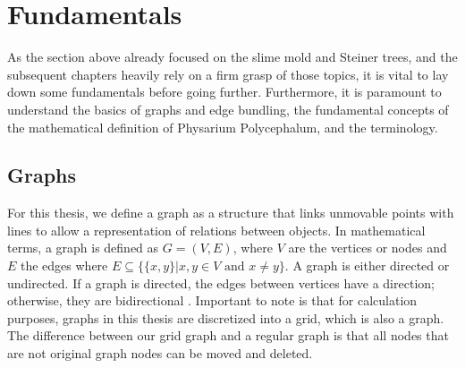 
\chapter{Fundamentals}
\label{sec:fundamentals}
As the section above already focused on the slime mold and Steiner trees, and the subsequent chapters heavily rely on a firm grasp of those topics, it is vital to lay down some fundamentals before going further. Furthermore, it is paramount to understand the basics of graphs and edge bundling, the fundamental concepts of the mathematical definition of Physarium Polycephalum, and the terminology. 

\section{Graphs}
\label{sec:graphs}

For this thesis, we define a graph as a structure that links unmovable points with lines to allow a representation of relations between objects. In mathematical terms, a graph is defined as $G = (V, E)$, where $V$ are the vertices or nodes and $E$ the edges where $E \subseteq \{\{x, y\} | x, y \in V \text{ and } x \neq y\}$. A graph is either directed or undirected. If a graph is directed, the edges between vertices have a direction; otherwise, they are bidirectional \cite{noauthor_graph_2022}. Important to note is that for calculation purposes, graphs in this thesis are discretized into a grid, which is also a graph. The difference between our grid graph and a regular graph is that all nodes that are not original graph nodes can be moved and deleted.

\newpage

